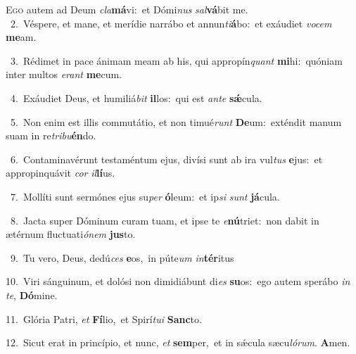 \lettrine{\initial\textcolor{\initialcolor}{E}}{go} autem ad Deum \textit{cla}\-\textbf{má}vi:~\star et Dómi\textit{nus} \textit{sal}\-\textbf{vá}bit me.\\
{\numbfont\textcolor{\numbcolor}{~2.}}~Véspere, et mane, et merídie narrábo et annun\-\textit{ti}\-\textbf{á}bo:~\star et exáudiet \textit{vo}\-\textit{cem} \textbf{me}\-am.\par
{\numbfont\textcolor{\numbcolor}{~3.}}~Rédimet in pace ánimam meam ab his, qui appropín\textit{quant} \textbf{mi}\-hi:~\star quóniam inter multos \textit{e}\-\textit{rant} \textbf{me}\-cum.\par
{\numbfont\textcolor{\numbcolor}{~4.}}~Exáudiet Deus, et humiliá\textit{bit} \textbf{il}\-los:~\star qui est \textit{an}\-\textit{te} \textbf{sǽ}\-cula.\par
{\numbfont\textcolor{\numbcolor}{~5.}}~Non enim est illis commutátio, et non timué\textit{runt} \textbf{De}\-um:~\star exténdit manum suam in re\-\textit{tri}\-\textit{bu}\textbf{én}do.\par
{\numbfont\textcolor{\numbcolor}{~6.}}~Contaminavérunt testaméntum ejus, divísi sunt ab ira vul\textit{tus} \textbf{e}\-jus:~\star et appropinquávit \textit{cor} \textit{il}\-\textbf{lí}us.\par
{\numbfont\textcolor{\numbcolor}{~7.}}~Mollíti sunt sermónes ejus su\textit{per} \textbf{ó}\-leum:~\star et ip\textit{si} \textit{sunt} \textbf{já}\-cula.\par
{\numbfont\textcolor{\numbcolor}{~8.}}~Jacta super Dóminum curam tuam, et ipse te \textit{e}\-\textbf{nú}triet:~\star non dabit in ætérnum fluctuati\-\textit{ó}\-\textit{nem} \textbf{jus}\-to.\par
{\numbfont\textcolor{\numbcolor}{~9.}}~Tu vero, Deus, dedú\textit{ces} \textbf{e}\-os,~\star in púte\textit{um} \textit{in}\-\textbf{tér}itus\par
{\numbfont\textcolor{\numbcolor}{10.}}~Viri sánguinum, et dolósi non dimidiábunt di\textit{es} \textbf{su}\-os:~\star ego autem sperábo \textit{in} \textit{te}\-, \textbf{Dó}\-mine.\par
{\numbfont\textcolor{\numbcolor}{11.}}~Glória Patri, \textit{et} \textbf{Fí}\-lio,~\star et Spirí\-\textit{tu}\-\textit{i} \textbf{Sanc}\-to.\par
{\numbfont\textcolor{\numbcolor}{12.}}~Sicut erat in princípio, et nunc, \textit{et} \textbf{sem}\-per,~\star et in sǽcula sæcu\-\textit{ló}\-\textit{rum}. \textbf{A}\-men.\par
